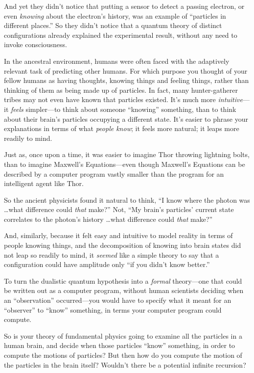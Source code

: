 {
 And yet they didn't notice that putting a sensor
to detect a passing electron, or even \textit{knowing} about the
electron's history, was an example of
``particles in different places.''
So they didn't notice that a quantum theory of distinct
configurations already explained the experimental result, without any
need to invoke consciousness.}

{
 In the ancestral environment, humans were often faced with the
adaptively relevant task of predicting other humans. For which purpose
you thought of your fellow humans as having thoughts, knowing things
and feeling things, rather than thinking of them as being made up of
particles. In fact, many hunter-gatherer tribes may not even have known
that particles existed. It's much more
\textit{intuitive}{}---it \textit{feels} simpler---to think about
someone ``knowing'' something, than
to think about their brain's particles occupying a
different state. It's easier to phrase your
explanations in terms of what \textit{people know}; it feels more
natural; it leaps more readily to mind.}

{
 Just as, once upon a time, it was easier to imagine Thor throwing
lightning bolts, than to imagine Maxwell's
Equations---even though Maxwell's Equations can be
described by a computer program vastly smaller than the program for an
intelligent agent like Thor.}

{
 So the ancient physicists found it natural to think,
``I know where the photon was \ldots what difference
could \textit{that} make?'' Not,
``My brain's
particles' current state correlates to the
photon's history \ldots what difference could
\textit{that} make?''}

{
 And, similarly, because it felt easy and intuitive to model
reality in terms of people knowing things, and the decomposition of
knowing into brain states did not leap so readily to mind, it
\textit{seemed} like a simple theory to say that a configuration could
have amplitude only ``if you didn't
know better.''}

{
 To turn the dualistic quantum hypothesis into a \textit{formal}
theory---one that could be written out as a computer program, without
human scientists deciding when an
``observation'' occurred---you would
have to specify what it meant for an
``observer'' to
``know'' something, in terms your
computer program could compute.}

{
 So is your theory of fundamental physics going to examine all the
particles in a human brain, and decide when those particles
``know'' something, in order to
compute the motions of particles? But then how do you compute the
motion of the particles in the brain itself? Wouldn't
there be a potential infinite recursion?}

